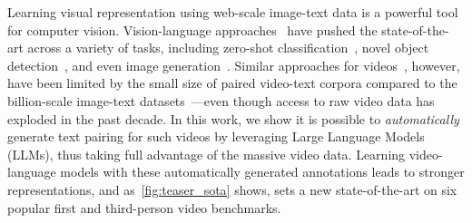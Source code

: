 \documentclass[10pt,twocolumn,letterpaper]{article}
\begin{document}
Learning visual representation using web-scale image-text data is a powerful tool for computer vision. Vision-language approaches~\cite{radford2021clip,yu2022coca,jia2021align} have pushed the state-of-the-art across a variety of tasks, including
zero-shot classification~\cite{radford2021clip}, novel object detection~\cite{zhou2022detecting}, and even image generation~\cite{ramesh2022hierarchical}.
Similar approaches for videos~\cite{bain2021frozen,nagrani2022learning,lin2022egovlp}, however, have been limited by the small size of paired video-text corpora compared to the billion-scale image-text datasets~\cite{radford2021clip,jia2021align,zhai2022scaling}---even though access to
raw video data has exploded in the past decade. In this work, we show it is possible to {\em automatically} generate text pairing for such videos by leveraging Large Language Models (LLMs), thus taking full advantage of the massive video data.
Learning video-language models with these automatically generated annotations leads to stronger representations,
and as~\cref{fig:teaser_sota} shows, sets a new state-of-the-art on six popular first and third-person video benchmarks.
\end{document}
